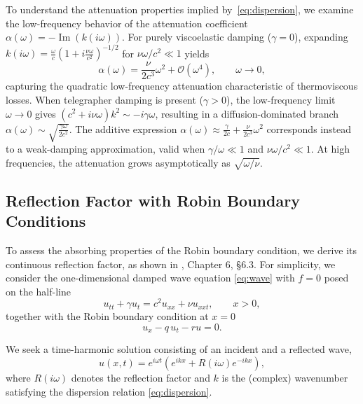 \documentclass{Configuration_Files/PoliMi3i_thesis}
\newif\ifshowthesischanges
\DeclareRobustCommand{\thesischange}[2]{%
    \ifshowthesischanges
        \textcolor{#1}{#2}%
    \else
        #2%
    \fi
}
\def\thesischange#1#2{#2}%
\begin{document}
\thesischange{red}{To understand the attenuation properties implied by~\eqref{eq:dispersion}, we examine the low-frequency behavior of the attenuation coefficient $\alpha(\omega) = -\operatorname{Im}(k(i\omega))$. For purely viscoelastic damping ($\gamma = 0$), expanding $k(i\omega) = \frac{\omega}{c}\left(1 + i\frac{\nu\omega}{c^2}\right)^{-1/2}$ for $\nu\omega/c^2 \ll 1$ yields
\begin{equation*}
\alpha(\omega) = \frac{\nu}{2c^3}\omega^2 + \mathcal{O}(\omega^4), \qquad \omega \to 0,
\end{equation*}
capturing the quadratic low-frequency attenuation characteristic of thermoviscous losses. When telegrapher damping is present ($\gamma > 0$), the low-frequency limit $\omega \to 0$ gives $(c^2 + i\nu\omega)k^2 \sim -i\gamma\omega$, resulting in a diffusion-dominated branch $\alpha(\omega) \sim \sqrt{\frac{\gamma\omega}{2c^2}}$. The additive expression $\alpha(\omega) \approx \frac{\gamma}{2c} + \frac{\nu}{2c^3}\omega^2$ corresponds instead to a weak-damping approximation, valid when $\gamma/\omega \ll 1$ and $\nu\omega/c^2 \ll 1$. At high frequencies, the attenuation grows asymptotically as $\sqrt{\omega/\nu}$.}

\subsection{Reflection Factor with Robin Boundary Conditions}
To assess the absorbing properties of the Robin boundary condition, we derive its continuous reflection factor, as shown in \cite{kuttruff_acoustics_2007}, Chapter 6, \S6.3. For simplicity, we consider the one-dimensional damped wave equation \eqref{eq:wave} with \(f=0\) posed on the half-line
\begin{equation*}
u_{tt}
+\gamma u_t
=
c^2u_{xx}
+\nu u_{xxt},
\qquad
x>0,
\end{equation*}
together with the Robin boundary condition at $x=0$
\begin{equation*}
u_x-q\,u_t-ru=0.
\end{equation*}

We seek a time-harmonic solution consisting of an incident and a reflected wave,
\begin{equation*}
u(x,t)
=
e^{i\omega t}
\left(
e^{ikx}
+
R(i\omega)e^{-ikx}
\right),
\end{equation*}
where \(R(i\omega)\) denotes the reflection factor and \(k\) is the (complex) wavenumber satisfying the dispersion relation \eqref{eq:dispersion}.
\end{document}

